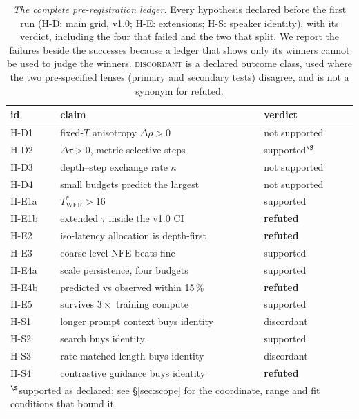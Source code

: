 \documentclass{article}
\begin{document}
\begin{table}[h]
  \centering\small
  \caption{\emph{The complete pre-registration ledger.} Every hypothesis declared before the
  first run (H-D: main grid, v1.0; H-E: extensions; H-S: speaker identity), with its verdict, including the four that failed and the two that split. We
  report the failures beside the successes because a ledger that shows only its winners
  cannot be used to judge the winners. \textsc{discordant} is a declared outcome class, used
  where the two pre-specified lenses (primary and secondary tests) disagree, and is not a synonym for refuted.}
  \footnotesize
  \begin{tabular}{lll}
    \toprule
    id & claim & verdict \\
    \midrule
    H-D1 & fixed-$T$ anisotropy $\Delta\rho>0$ & not supported \\
    H-D2 & $\Delta\tau>0$, metric-selective steps & supported$^{\S}$ \\
    H-D3 & depth--step exchange rate $\kappa$ & not supported \\
    H-D4 & small budgets predict the largest & not supported \\
    H-E1a & $T^{*}_{\mathrm{WER}}>16$ & supported \\
    H-E1b & extended $\tau$ inside the v1.0 CI & \textbf{refuted} \\
    H-E2 & iso-latency allocation is depth-first & \textbf{refuted} \\
    H-E3 & coarse-level NFE beats fine & supported \\
    H-E4a & scale persistence, four budgets & supported \\
    H-E4b & predicted vs observed within 15\,\% & \textbf{refuted} \\
    H-E5 & survives $3\times$ training compute & supported \\
    H-S1 & longer prompt context buys identity & discordant \\
    H-S2 & search buys identity & supported \\
    H-S3 & rate-matched length buys identity & discordant \\
    H-S4 & contrastive guidance buys identity & \textbf{refuted} \\
    \midrule
    \multicolumn{3}{l}{\footnotesize $^{\S}$supported as declared; see \S\ref{sec:scope} for
    the coordinate, range and fit conditions that bound it.} \\
    \bottomrule
  \end{tabular}
  \label{tab:prereg}
\end{table}
\end{document}
